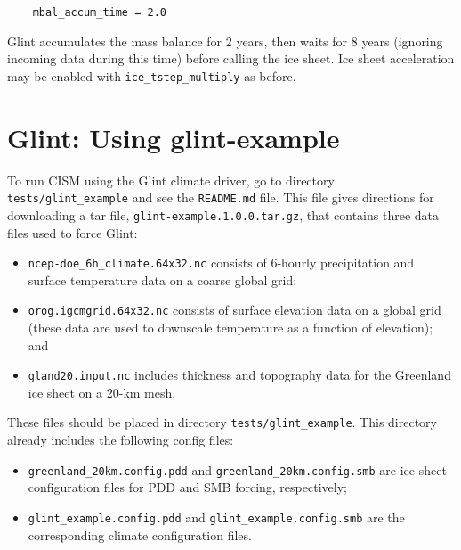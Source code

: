 \begin{verbatim}
    mbal_accum_time = 2.0
\end{verbatim}
%
Glint accumulates the mass balance for 2 years, then waits for 8 years (ignoring incoming 
data during this time) before calling the ice sheet. Ice sheet 
acceleration may be enabled with \texttt{ice\_tstep\_multiply} as before.

%


\section{Glint: Using glint-example}
\label{ug.use_glint}
To run CISM using the Glint climate driver, go to directory \texttt{tests/glint\_example} 
and see the \texttt{README.md} file.
This file gives directions for downloading a tar file,
\texttt{glint-example.1.0.0.tar.gz}, that contains three data files
used to force Glint:
%
\begin{itemize}
\item \texttt{ncep-doe\_6h\_climate.64x32.nc} consists of 6-hourly precipitation and
surface temperature data on a coarse global grid;
\item \texttt{orog.igcmgrid.64x32.nc} consists of surface elevation data on a global grid
(these data are used to downscale temperature as a function of elevation); and
\item \texttt{gland20.input.nc} includes thickness and topography data for the Greenland 
ice sheet on a 20-km mesh.
\end{itemize}
%
These files should be placed in directory \texttt{tests/glint\_example}. 
This directory already includes the following config files:
\begin{itemize}
\item \texttt{greenland\_20km.config.pdd} and \texttt{greenland\_20km.config.smb} are
ice sheet configuration files for PDD and SMB forcing, respectively;
\item \texttt{glint\_example.config.pdd} and \texttt{glint\_example.config.smb} are the
corresponding climate configuration files.
\end{itemize}

